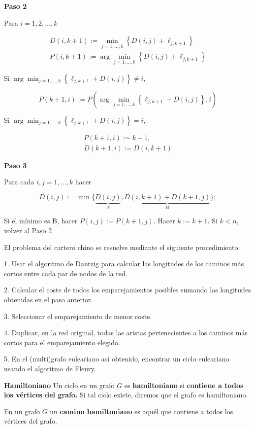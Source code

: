 \documentclass[openany]{book}
\begin{document}
\begin{center}
\textbf{Paso 2}
\end{center}

Para $i=1,2, \ldots, k$

$$
\begin{gathered}
D(i, k+1):=\min _{j=1, \ldots, k}\left\{D(i, j)+\ell_{j, k+1}\right\} \\
P(i, k+1):=\arg \min _{j=1, \ldots, k}\left\{D(i, j)+\ell_{j, k+1}\right\}
\end{gathered}
$$

Si $\arg \min _{j=1, \ldots, k}\left\{\ell_{j, k+1}+D(i, j)\right\} \neq i$,

$$
P(k+1, i):=P\left(\arg \min _{j=1, \ldots, k}\left\{\ell_{j, k+1}+D(i, j)\right\}, i\right)
$$

Si $\arg \min _{j=1, \ldots, k}\left\{\ell_{j, k+1}+D(i, j)\right\}=i$,

$$
\begin{gathered}
P(k+1, i):=k+1, \\
D(k+1, i):=D(i, k+1)
\end{gathered}
$$

\begin{center}
\textbf{Paso 3}
\end{center}

Para cada $i, j=1, \ldots, k$ hacer

$$
D(i, j):=\min \{\underbrace{D(i, j)}_{A}, \underbrace{D(i, k+1)+D(k+1, j)}_{B}\} ;
$$

Si el mínimo es B, hacer $P(i, j):=P(k+1, j)$. Hacer $k:=k+1 .$ Si $k<n$, volver al Paso 2

El problema del cartero chino se resuelve mediante el siguiente procedimiento:

  1. Usar el algoritmo de Dantzig para calcular las longitudes de los caminos más cortos entre cada par de nodos de la red.

  2. Calcular el coste de todos los emparejamientos posibles sumando las longitudes obtenidas en el paso anterior.

  3. Seleccionar el emparejamiento de menor coste.

  4. Duplicar, en la red original, todas las aristas pertenecientes a los caminos más cortos para el emparejamiento elegido.

  5. En el (multi)grafo euleariano así obtenido, encontrar un ciclo euleariano usando el algoritmo de Fleury.

\begin{definition}
  { \color{turquoise} \textbf{Hamiltoniano}}
  Un ciclo en un grafo $G$ es \textbf{hamiltoniano} si \textbf{contiene a todos los vértices del grafo.} Si tal ciclo existe, diremos que el grafo es hamiltoniano.

  En un grafo $G$ un \textbf{camino hamiltoniano} es aquél que contiene a todos los vértices del grafo.

\end{definition}
\end{document}
